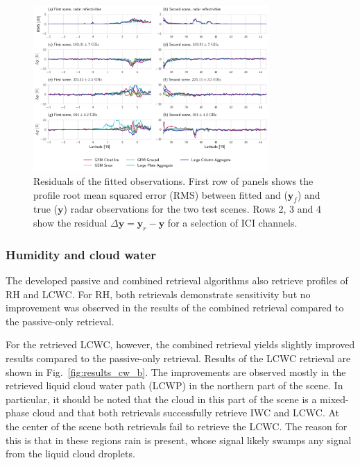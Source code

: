 \documentclass[journal abbreviation, manuscript]{copernicus}
\begin{document}
\begin{figure}[!h]
\centering
\includegraphics[width = 0.8\textwidth]{../plots/misfits}
\caption{Residuals of the fitted observations. First row of panels shows the
  profile root mean squared error (RMS) between fitted and ($\mathbf{y}_f$) and
  true ($\mathbf{y}$) radar observations for the two test scenes. Rows 2, 3 and
  4 show the residual $\Delta \mathbf{y} = \mathbf{y}_r - \mathbf{y}$ for a
  selection of ICI channels.}
\label{fig:misfit}
\end{figure}

\subsubsection{Humidity and cloud water}

The developed passive and combined retrieval algorithms also retrieve profiles
of RH and LCWC. For RH, both retrievals demonstrate sensitivity but no
improvement was observed in the results of the combined retrieval compared to
the passive-only retrieval.

For the retrieved LCWC, however, the combined retrieval yields slightly improved
results compared to the passive-only retrieval. Results of the LCWC retrieval
are shown in Fig.~\ref{fig:results_cw_b}. The improvements are observed mostly
in the retrieved liquid cloud water path (LCWP) in the northern part of the
scene. In particular, it should be noted that the cloud in this part of the
scene is a mixed-phase cloud and that both retrievals successfully retrieve IWC
and LCWC. At the center of the scene both retrievals fail to retrieve
the LCWC. The reason for this is that in these regions rain is present, whose
signal likely swamps any signal from the liquid cloud droplets.
\end{document}
